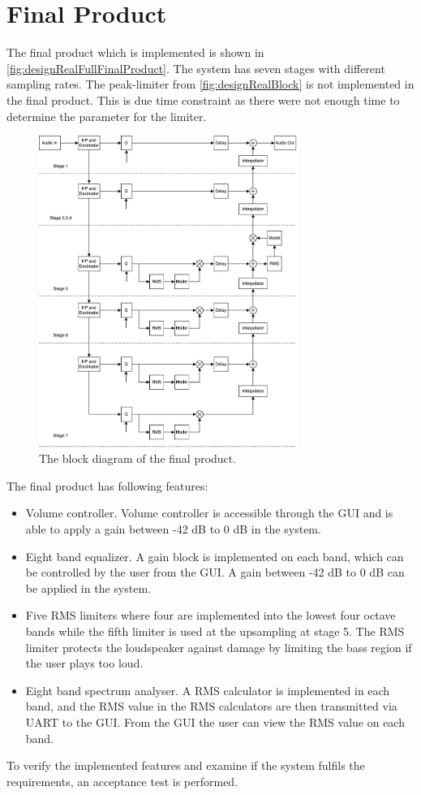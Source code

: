 \chapter{Final Product} \label{ch:finalProduct}

The final product which is implemented is shown in \autoref{fig:designRealFullFinalProduct}. The system has seven stages with different sampling rates. The peak-limiter from \autoref{fig:designRealBlock} is not implemented in the final product. This is due time constraint as there were not enough time to determine the parameter for the limiter.

\begin{figure}[H]
\centering
\includegraphics[width=0.75\textwidth]{figures/designRealFullFinalProduct.pdf}
\caption{The block diagram of the final product.}
\label{fig:designRealFullFinalProduct}
\end{figure}

The final product has following features:

\begin{itemize}
\item Volume controller. Volume controller is accessible through the GUI and is able to apply a gain between -42 dB to 0 dB in the system.
\item Eight band equalizer. A gain block is implemented on each band, which can be controlled by the user from the GUI. A gain between -42 dB to 0 dB can be applied in the system.
\item Five RMS limiters where four are implemented into the lowest four octave bands while the fifth limiter is used at the upsampling at stage 5. The RMS limiter protects the loudspeaker against damage by limiting the bass region if the user plays too loud. 
\item Eight band spectrum analyser. A RMS calculator is implemented in each band, and the RMS value in the RMS calculators are then transmitted via UART to the GUI. From the GUI the user can view the RMS value on each band.
\end{itemize}

To verify the implemented features and examine if the system fulfils the requirements, an acceptance test is performed.



